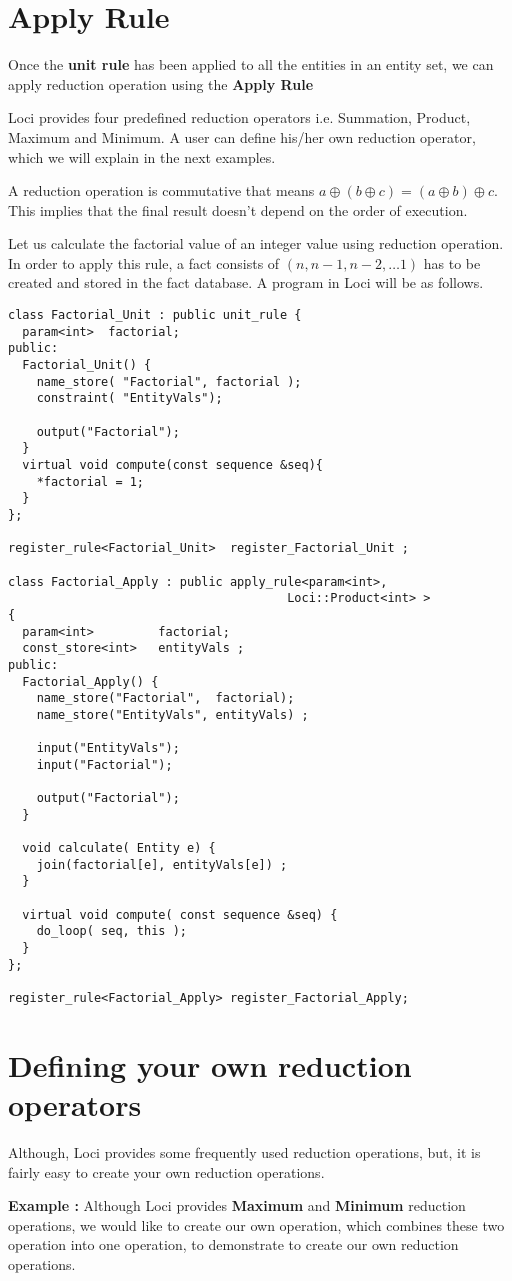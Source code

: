 \section { Apply Rule }
Once the {\bf unit rule } has been applied to all the entities in an entity
set, we can apply reduction operation using the {\bf Apply Rule}

\par Loci provides four predefined reduction operators i.e. Summation, Product,
Maximum and Minimum. A user can define his/her own reduction operator, which we
will explain in the next examples.

\par A reduction operation is commutative that means $a\oplus (b \oplus c) =  (a \oplus b) \oplus c$.
This implies that the final result doesn't depend on the order of execution. 

\par Let us calculate the factorial value of an integer value using reduction operation.
In order to apply this rule, a fact consists of $(n,n-1,n-2, \dots 1)$
has to be created and stored in the fact database. A program in Loci will be 
as follows.
%
\begin{verbatim}
class Factorial_Unit : public unit_rule {
  param<int>  factorial;
public:
  Factorial_Unit() {
    name_store( "Factorial", factorial );
    constraint( "EntityVals");

    output("Factorial");
  }
  virtual void compute(const sequence &seq){
    *factorial = 1;
  }
};

register_rule<Factorial_Unit>  register_Factorial_Unit ;

class Factorial_Apply : public apply_rule<param<int>,
                                       Loci::Product<int> >
{
  param<int>         factorial;
  const_store<int>   entityVals ;
public:
  Factorial_Apply() {
    name_store("Factorial",  factorial);
    name_store("EntityVals", entityVals) ;

    input("EntityVals");
    input("Factorial");

    output("Factorial");
  }

  void calculate( Entity e) {
    join(factorial[e], entityVals[e]) ;
  }

  virtual void compute( const sequence &seq) {
    do_loop( seq, this );
  }
};

register_rule<Factorial_Apply> register_Factorial_Apply;
\end{verbatim}

%
\section { Defining your own reduction operators }
Although, Loci provides some frequently used reduction operations, but, it is fairly 
easy to create your own reduction operations. 
%
\par {\bf Example :} Although Loci provides {\bf Maximum } and {\bf Minimum} reduction
operations, we would like to create our own operation, which combines these two operation
into one operation, to demonstrate to create our own reduction operations.

